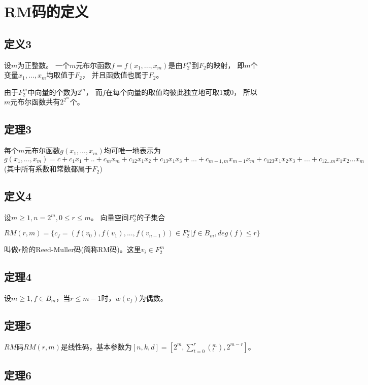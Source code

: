 \documentclass[onecolumn,oneside]{BUPTHomework}
\begin{document}
  \section*{RM码的定义}

  \subsection*{定义3}

  设$m$为正整数。
  一个$m$元布尔函数$f=f(x_1,...,x_m)$是由$F^m_2$到$F_2$的映射，
  即$m$个变量$x_1,...,x_m$均取值于$F_2$，
  并且函数值也属于$F_2$。

  由于$F^m_2$中向量的个数为$2^m$，
  而$f$在每个向量的取值均彼此独立地可取1或0，
  所以$m$元布尔函数共有$2^{2^m}个$。

  \subsection*{定理3}

  每个$m$元布尔函数$g(x_1,...,x_m)$均可唯一地表示为$g(x_1,...,x_m)=c+c_1x_1+..+c_mx_m+c_{12}x_1x_2+c_{13}x_1x_3+...+c_{m-1,m}x_{m-1}x_m+c_{123}x_1x_2x_3+...+c_{12...m}x_1x_2...x_m$(其中所有系数和常数都属于$F_2$)

  \subsection*{定义4}

  设$m \geq 1,n=2^m,0 \leq r \leq m$。
  向量空间$F^n_2$的子集合
  
  $$RM(r,m)=\{c_f=(f(v_0),f(v_1),...,f(v_{n-1})) \in F^n_2 \vert f \in B_m, deg(f) \leq r \}$$

  叫做$r$阶的Reed-Muller码(简称RM码)。这里$v_i \in F^m_2$

  \subsection*{定理4}

  设$m \geq 1,f \in B_m$，当$r \leq m-1$时，$w(c_f)$为偶数。

  \subsection*{定理5}

  $RM$码$RM(r,m)$是线性码，基本参数为$[n,k,d]=[2^m,\sum^r_{t=0}(^m_t),2^{m-r}]$。

  \subsection*{定理6}
\end{document}
